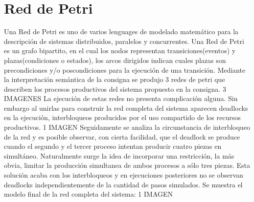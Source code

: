 \documentclass[12pt]{article} %
\begin{document}
\section{Red de Petri}
Una Red de Petri es uno de varios lenguages de modelado matemático para la descripción de sistemas distribuidos, paralelos y concurrentes. Una Red de Petri es un grafo bipartito, en el cual los nodos representan transiciones(eventos) y plazas(condiciones o estados), los arcos dirigidos indican cuales plazas son precondiciones y/o poscondiciones para la ejecución de una transición. 
Mediante la interpretación semántica de la consigna se produjo 3 redes de petri que describen los procesos productivos del sistema propuesto en la consigna.
3 IMAGENES
La ejecución de estas redes no presenta complicación alguna. Sin embargo al unirlas para construir la red completa del sistema aparecen deadlocks en la ejecución, interbloqueos producidos por el uso compartido de los recursos productivos.
1 IMAGEN
Seguidamente se analiza la circunstancia de interbloqueo de la red y es posible observar, con cierta facilidad, que el deadlock se produce cuando el segundo y el tercer proceso intentan producir cuatro piezas en simultáneo.
Naturalmente surge la idea de incorporar una restricción, la más obvia, limitar la producción simultanea de ambos procesos a sólo tres piezas.
Esta solución acaba con los interbloqueos y en ejecuciones posteriores no se observan deadlocks independientemente de la cantidad de pasos simulados.
Se muestra el modelo final de la red completa del sistema:
1 IMAGEN
\newpage
\begin{figure}[H] %
\label{fig:RedFinal}
\end{figure}
\end{document}
